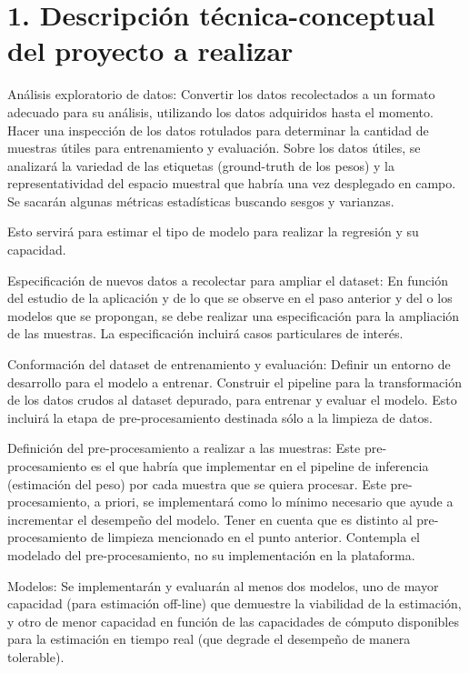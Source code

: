 \documentclass[
11pt, %
codirector, %
]{charter}
\begin{document}
\section{1. Descripción técnica-conceptual del proyecto a realizar}
\label{sec:descripcion}



Análisis exploratorio de datos:
Convertir los datos recolectados a un formato adecuado para su análisis, utilizando los datos adquiridos hasta el momento. Hacer una inspección de los datos rotulados para determinar la cantidad de muestras útiles para entrenamiento y evaluación. Sobre los datos útiles, se analizará la variedad de las etiquetas (ground-truth de los pesos) y la representatividad del espacio muestral que habría una vez desplegado en campo. Se sacarán algunas métricas estadísticas buscando sesgos y varianzas.

Esto servirá para estimar el tipo de modelo para realizar la regresión y su capacidad.

Especificación de nuevos datos a recolectar para ampliar el dataset:
En función del estudio de la aplicación y de lo que se observe en el paso anterior y del o los modelos que se propongan, se debe realizar una especificación para la ampliación de las muestras. La especificación incluirá casos particulares de interés.

Conformación del dataset de entrenamiento y evaluación:
Definir un entorno de desarrollo para el modelo a entrenar. Construir el pipeline para la transformación de los datos crudos al dataset depurado, para entrenar y evaluar el modelo. Esto incluirá la etapa de pre-procesamiento destinada sólo a la limpieza de datos.

Definición del pre-procesamiento a realizar a las muestras:
Este pre-procesamiento es el que habría que implementar en el pipeline de inferencia (estimación del peso) por cada muestra que se quiera procesar. Este pre-procesamiento, a priori, se implementará como lo mínimo necesario que ayude a incrementar el desempeño del modelo. Tener en cuenta que es distinto al pre-procesamiento de limpieza mencionado en el punto anterior.
Contempla el modelado del pre-procesamiento, no su implementación en la
plataforma.

Modelos:
Se implementarán y evaluarán al menos dos modelos, uno de mayor capacidad (para estimación off-line) que demuestre la viabilidad de la estimación, y otro de menor capacidad en función de las capacidades de cómputo disponibles para la estimación en tiempo real (que degrade el desempeño de manera tolerable).
\end{document}
